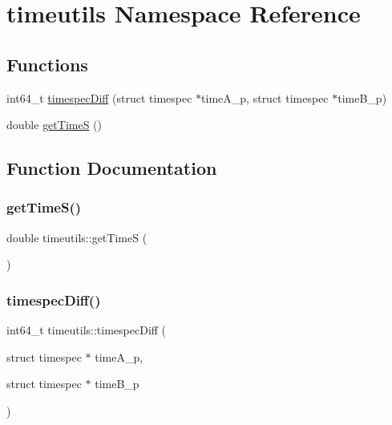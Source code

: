 \hypertarget{namespacetimeutils}{}\section{timeutils Namespace Reference}
\label{namespacetimeutils}
\subsection*{Functions}
\begin{DoxyCompactItemize}
\item 
int64\+\_\+t \mbox{\hyperlink{namespacetimeutils_a3d9d509a7028cffae8aef9c70f6c2c52}{timespec\+Diff}} (struct timespec $\ast$time\+A\+\_\+p, struct timespec $\ast$time\+B\+\_\+p)
\item 
double \mbox{\hyperlink{namespacetimeutils_aa732b7f41462ff727daef77bd5030b9c}{get\+TimeS}} ()
\end{DoxyCompactItemize}


\subsection{Function Documentation}
\mbox{\label{namespacetimeutils_aa732b7f41462ff727daef77bd5030b9c}} 
\subsubsection{\texorpdfstring{getTimeS()}{getTimeS()}}
{\footnotesize\ttfamily double timeutils\+::get\+TimeS (\begin{DoxyParamCaption}{ }\end{DoxyParamCaption})}

\mbox{\label{namespacetimeutils_a3d9d509a7028cffae8aef9c70f6c2c52}} 
\subsubsection{\texorpdfstring{timespecDiff()}{timespecDiff()}}
{\footnotesize\ttfamily int64\+\_\+t timeutils\+::timespec\+Diff (\begin{DoxyParamCaption}\item[{struct timespec $\ast$}]{time\+A\+\_\+p,  }\item[{struct timespec $\ast$}]{time\+B\+\_\+p }\end{DoxyParamCaption})}


